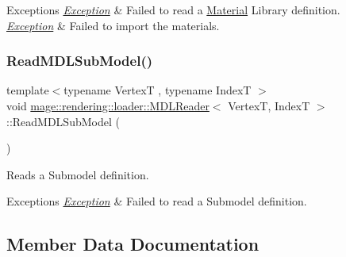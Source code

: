 \begin{DoxyExceptions}{Exceptions}
{\em \mbox{\hyperlink{classmage_1_1_exception}{Exception}}} & Failed to read a \mbox{\hyperlink{classmage_1_1rendering_1_1_material}{Material}} Library definition. \\
\hline
{\em \mbox{\hyperlink{classmage_1_1_exception}{Exception}}} & Failed to import the materials. \\
\hline
\end{DoxyExceptions}
\mbox{\label{classmage_1_1rendering_1_1loader_1_1_m_d_l_reader_afe15d41185ac5f4de6607561d7068d8c}} 
\subsubsection{\texorpdfstring{Read\+M\+D\+L\+Sub\+Model()}{ReadMDLSubModel()}}
{\footnotesize\ttfamily template$<$typename VertexT , typename IndexT $>$ \\
void \mbox{\hyperlink{classmage_1_1rendering_1_1loader_1_1_m_d_l_reader}{mage\+::rendering\+::loader\+::\+M\+D\+L\+Reader}}$<$ VertexT, IndexT $>$\+::Read\+M\+D\+L\+Sub\+Model (\begin{DoxyParamCaption}{ }\end{DoxyParamCaption})\hspace{0.3cm}{\ttfamily [private]}}

Reads a Submodel definition.


\begin{DoxyExceptions}{Exceptions}
{\em \mbox{\hyperlink{classmage_1_1_exception}{Exception}}} & Failed to read a Submodel definition. \\
\hline
\end{DoxyExceptions}


\subsection{Member Data Documentation}
\mbox{\label{classmage_1_1rendering_1_1loader_1_1_m_d_l_reader_aab6301fae258aaea1619856000a29e53}} 
